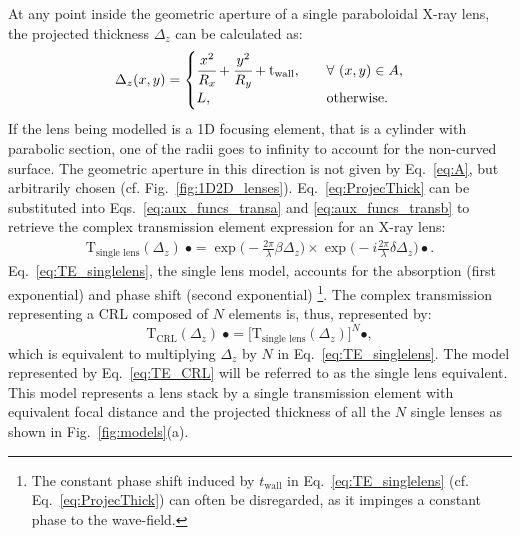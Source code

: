 \begin{refsection}
At any point inside the geometric aperture of a single paraboloidal X-ray lens, the projected thickness $\Delta_z$ can be calculated as:
\begin{equation}\label{eq:ProjecThick}
    \Delta_z(x,y) = 
     \begin{cases}
      \cfrac{x^2}{R_x}+\cfrac{y^2}{R_y}+\text{t}_\text{wall}, &\quad\forall~(x,y) \in A,\\
      L, &\quad\text{otherwise}.
     \end{cases}
\end{equation}
If the lens being modelled is a 1D focusing element, that is a cylinder with parabolic section, one of the radii goes to infinity to account for the non-curved surface. The geometric aperture in this direction is not given by Eq.~\ref{eq:A}, but arbitrarily chosen (cf. Fig.~\ref{fig:1D2D_lenses}). Eq.~\ref{eq:ProjecThick} can be substituted into Eqs.~\ref{eq:aux_funcs_transa} and \ref{eq:aux_funcs_transb} to retrieve the complex transmission element expression for an X-ray lens:
\begin{eqnarray}\label{eq:TE_singlelens} %
    \mathrm{T}_{\text{single lens}}(\Delta_z)~\bullet =
    \exp{\bigg(-\frac{2\pi}{\lambda}\beta\Delta_z \bigg)}
    \times\exp{\bigg(-i\frac{2\pi}{\lambda}\delta\Delta_z \bigg)} \bullet.
\end{eqnarray}{}
Eq.~\ref{eq:TE_singlelens}, the single lens model, accounts for the absorption (first exponential) and phase shift (second exponential) \footnote{The constant phase shift induced by $t_\text{wall}$ in Eq.~\ref{eq:TE_singlelens} (cf. Eq.~\ref{eq:ProjecThick}) can often be disregarded, as it impinges a constant phase to the wave-field.}. The complex transmission representing a CRL composed of $N$ elements is, thus, represented by:
\begin{equation}\label{eq:TE_CRL}
    \mathrm{T}_{\text{CRL}}(\Delta_z)~\bullet = \big[\mathrm{T}_{\text{single lens}}(\Delta_z)\big]^{N} \bullet,
\end{equation}{}
which is equivalent to multiplying $\Delta_z$ by $N$ in Eq.~\ref{eq:TE_singlelens}. The model represented by Eq.~\ref{eq:TE_CRL} will be referred to as the single lens equivalent. This model represents a lens stack by a single transmission element with equivalent focal distance and the projected thickness of all the $N$ single lenses as shown in Fig.~\ref{fig:models}(a).


\end{refsection}
